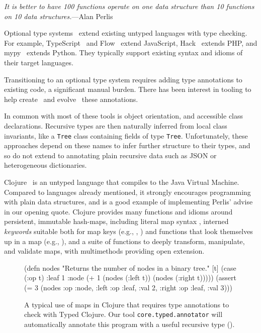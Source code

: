 
\emph{It is better to have 100 functions operate on one data structure than 10 functions on 10 data structures.}---Alan Perlis

Optional type systems~\cite{bracha2004pluggable} extend existing untyped languages
with type checking.
For example,
TypeScript~\cite{typescript} and Flow~\cite{flow} extend
JavaScript,
Hack~\cite{hack} extends PHP,
and
mypy~\cite{mypy} extends Python.
They typically support existing syntax and idioms of their target languages.

Transitioning to an optional type system
requires adding type annotations to existing code,
a significant manual burden.
There has been interest in 
tooling to help create~\cite{saftoiu2010jstrace,pyannotate,typette18,An10dynamicinference,pytype} and
evolve~\cite{kristensen2017inference}
these annotations.

In common with most of these tools is
object orientation, %
and accessible class declarations.
Recursive types are then naturally inferred from local class invariants,
like a \texttt{Tree} class containing fields of type \texttt{Tree}.
Unfortunately, these approaches depend on these names to infer
further structure to their types, and so
do not extend to annotating plain recursive data
such as JSON or heterogeneous dictionaries.

Clojure~\cite{Hic08} is an untyped language that compiles to the Java
Virtual Machine. Compared to languages already mentioned, it
strongly encourages programming with plain data structures, and is
a good example of implementing Perlis' advise in our opening quote.
Clojure provides
many functions and idioms around persistent, immutable hash-maps,
including literal map syntax , interned \emph{keywords}
suitable both for map keys (e.g., , ) and
functions that look themselves up in a map (e.g., ),
and a suite of functions to deeply transform, manipulate, and validate
maps, with multimethods providing open extension.

\begin{figure}
\begin{cljlisting}
(defn nodes
  "Returns the number of nodes in a binary tree."
  [t] (case (:op t)
        :leaf 1
        :node (+ 1 (nodes (:left t))
                   (nodes (:right t)))))
(assert (= 3 (nodes
               {:op :node,
                :left {:op :leaf, :val 2},
                :right {:op :leaf, :val 3}})))
\end{cljlisting}
\caption{A typical use of maps in Clojure
that requires type annotations
to check with Typed Clojure.
Our tool \texttt{core.typed.annotator}
will automatically annotate this program
with a useful recursive type ().
}
\label{fig:infer:nodes}
\end{figure}

